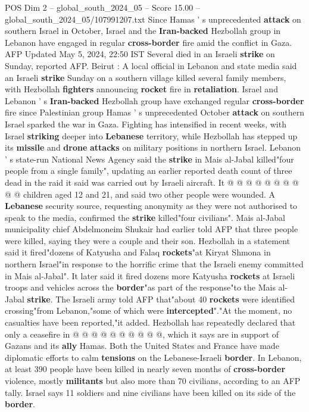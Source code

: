 \begin{textsample}{POS Dim 2 – global\_south\_2024\_05 – Score 15.00 – global\_south\_2024\_05/107991207.txt}  \label{ex:f2_pos_227}
Since Hamas ' s unprecedented \textbf{attack} on southern Israel in October, Israel and the \textbf{Iran-backed} Hezbollah group in Lebanon have engaged in regular \textbf{cross-border} fire amid the conflict in Gaza.
AFP Updated May 5, 2024, 22:50 IST Several died in an Israeli \textbf{strike} on Sunday, reported AFP.
Beirut : A local official in Lebanon and state media said an Israeli \textbf{strike} Sunday on a southern village killed several family members, with Hezbollah \textbf{fighters} announcing \textbf{rocket} fire in \textbf{retaliation}.
Israel and Lebanon ' s \textbf{Iran-backed} Hezbollah group have exchanged regular \textbf{cross-border} fire since Palestinian group Hamas ' s unprecedented October \textbf{attack} on southern Israel sparked the war in Gaza.
Fighting has intensified in recent weeks, with Israel \textbf{striking} deeper into \textbf{Lebanese} territory, while Hezbollah has stepped up its \textbf{missile} and \textbf{drone} \textbf{attacks} on military positions in northern Israel.
Lebanon ' s state-run National News Agency said the \textbf{strike} in Mais al-Jabal killed"four people from a single family", updating an earlier reported death count of three dead in the raid it said was carried out by Israeli aircraft.
It @ @ @ @ @ @ @ @ @ @ children aged 12 and 21, and said two other people were wounded.
A \textbf{Lebanese} security source, requesting anonymity as they were not authorised to speak to the media, confirmed the \textbf{strike} killed"four civilians".
Mais al-Jabal municipality chief Abdelmoneim Shukair had earlier told AFP that three people were killed, saying they were a couple and their son.
Hezbollah in a statement said it fired"dozens of Katyusha and Falaq \textbf{rockets}"at Kiryat Shmona in northern Israel"in response to the horrific crime that the Israeli enemy committed in Mais al-Jabal".
It later said it fired dozens more Katyusha \textbf{rockets} at Israeli troops and vehicles across the \textbf{border}"as part of the response"to the Mais al-Jabal \textbf{strike}.
The Israeli army told AFP that"about 40 \textbf{rockets} were identified crossing"from Lebanon,"some of which were \textbf{intercepted}"."At the moment, no casualties have been reported,"it added.
Hezbollah has repeatedly declared that only a ceasefire in @ @ @ @ @ @ @ @ @ @, which it says are in support of Gazans and its \textbf{ally} Hamas.
Both the United States and France have made diplomatic efforts to calm \textbf{tensions} on the Lebanese-Israeli \textbf{border}.
In Lebanon, at least 390 people have been killed in nearly seven months of \textbf{cross-border} violence, mostly \textbf{militants} but also more than 70 civilians, according to an AFP tally.
Israel says 11 soldiers and nine civilians have been killed on its side of the \textbf{border}.

\end{textsample}
